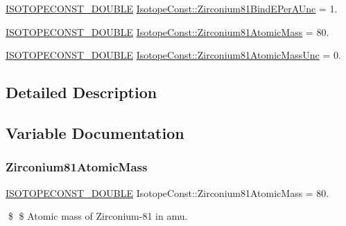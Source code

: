 \begin{DoxyCompactItemize}
\mbox{\hyperlink{group___isotope_const-_macros_ga8f45a7272ce02c0b4c65c44636ed719a}{I\+S\+O\+T\+O\+P\+E\+C\+O\+N\+S\+T\+\_\+\+D\+O\+U\+B\+LE}} \mbox{\hyperlink{group___isotope_const-_zirconium-_zr81_gac226c20efdf181e8f6d833911856eed1}{Isotope\+Const\+::\+Zirconium81\+Bind\+E\+Per\+A\+Unc}} = 1.
\item 
\mbox{\hyperlink{group___isotope_const-_macros_ga8f45a7272ce02c0b4c65c44636ed719a}{I\+S\+O\+T\+O\+P\+E\+C\+O\+N\+S\+T\+\_\+\+D\+O\+U\+B\+LE}} \mbox{\hyperlink{group___isotope_const-_zirconium-_zr81_ga0b51641f087ab2d6145ee84d739d608b}{Isotope\+Const\+::\+Zirconium81\+Atomic\+Mass}} = 80.
\item 
\mbox{\hyperlink{group___isotope_const-_macros_ga8f45a7272ce02c0b4c65c44636ed719a}{I\+S\+O\+T\+O\+P\+E\+C\+O\+N\+S\+T\+\_\+\+D\+O\+U\+B\+LE}} \mbox{\hyperlink{group___isotope_const-_zirconium-_zr81_ga13663c9f6034143f7785820da40578f0}{Isotope\+Const\+::\+Zirconium81\+Atomic\+Mass\+Unc}} = 0.
\end{DoxyCompactItemize}


\subsection{Detailed Description}


\subsection{Variable Documentation}
\mbox{\label{group___isotope_const-_zirconium-_zr81_ga0b51641f087ab2d6145ee84d739d608b}} 
\subsubsection{\texorpdfstring{Zirconium81\+Atomic\+Mass}{Zirconium81AtomicMass}}
{\footnotesize\ttfamily \mbox{\hyperlink{group___isotope_const-_macros_ga8f45a7272ce02c0b4c65c44636ed719a}{I\+S\+O\+T\+O\+P\+E\+C\+O\+N\+S\+T\+\_\+\+D\+O\+U\+B\+LE}} Isotope\+Const\+::\+Zirconium81\+Atomic\+Mass = 80.}

\$ \$ Atomic mass of Zirconium-\/81 in amu. \mbox{\label{group___isotope_const-_zirconium-_zr81_ga13663c9f6034143f7785820da40578f0}} 
